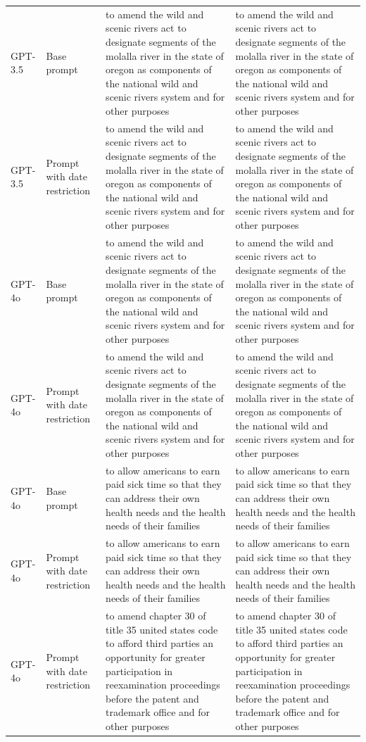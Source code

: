 \begin{longtable}{>{\raggedright\arraybackslash}p{1.4cm}>{\raggedright\arraybackslash}p{1.4cm}>{\raggedright\arraybackslash}p{5.5cm}>{\raggedright\arraybackslash}p{5.5cm}}
GPT-3.5 & Base prompt & to amend the wild and scenic rivers act to designate segments of the molalla river in the state of oregon as components of the national wild and scenic rivers system and for other purposes & to amend the wild and scenic rivers act to designate segments of the molalla river in the state of oregon as components of the national wild and scenic rivers system and for other purposes\\
GPT-3.5 & Prompt with date restriction & to amend the wild and scenic rivers act to designate segments of the molalla river in the state of oregon as components of the national wild and scenic rivers system and for other purposes & to amend the wild and scenic rivers act to designate segments of the molalla river in the state of oregon as components of the national wild and scenic rivers system and for other purposes\\
GPT-4o & Base prompt & to amend the wild and scenic rivers act to designate segments of the molalla river in the state of oregon as components of the national wild and scenic rivers system and for other purposes & to amend the wild and scenic rivers act to designate segments of the molalla river in the state of oregon as components of the national wild and scenic rivers system and for other purposes\\
GPT-4o & Prompt with date restriction & to amend the wild and scenic rivers act to designate segments of the molalla river in the state of oregon as components of the national wild and scenic rivers system and for other purposes & to amend the wild and scenic rivers act to designate segments of the molalla river in the state of oregon as components of the national wild and scenic rivers system and for other purposes\\
GPT-4o & Base prompt & to allow americans to earn paid sick time so that they can address their own health needs and the health needs of their families & to allow americans to earn paid sick time so that they can address their own health needs and the health needs of their families\\
GPT-4o & Prompt with date restriction & to allow americans to earn paid sick time so that they can address their own health needs and the health needs of their families & to allow americans to earn paid sick time so that they can address their own health needs and the health needs of their families\\
GPT-4o & Prompt with date restriction & to amend chapter 30 of title 35 united states code to afford third parties an opportunity for greater participation in reexamination proceedings before the patent and trademark office and for other purposes & to amend chapter 30 of title 35 united states code to afford third parties an opportunity for greater participation in reexamination proceedings before the patent and trademark office and for other purposes\\

\end{longtable}
